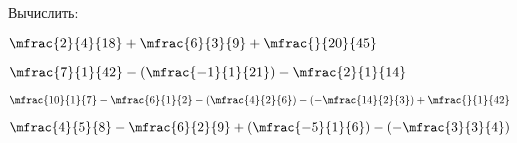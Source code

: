 \begin{class}[number=6]
\begin{listofex}
		\item Вычислить:
		\begin{enumcols}[itemcolumns=2]
			\item \( \mfrac{2}{4}{18}+\mfrac{6}{3}{9}+\mfrac{}{20}{45} \)
			\item \( \mfrac{7}{1}{42}-\left( \mfrac{-1}{1}{21} \right) - \mfrac{2}{1}{14}  \)
			\item \( \mfrac{10}{1}{7}-\mfrac{6}{1}{2}-\left( \mfrac{4}{2}{6} \right)-\left( -\mfrac{14}{2}{3} \right) + \mfrac{}{1}{42} \)
			\item \( \mfrac{4}{5}{8}-\mfrac{6}{2}{9}+\left( \mfrac{-5}{1}{6} \right)-\left( -\mfrac{3}{3}{4} \right) \)
		\end{enumcols}
	\end{listofex}
\end{class}
%
%
%
%	
%
%
